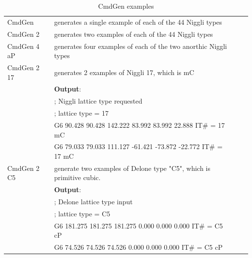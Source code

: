 \documentclass[preprint]{iucr}              %
\numberwithin{equation}{section}
\begin{document}
\begin{table}
		
		\label{CMDGENexamples}
		\caption{CmdGen examples}

		
		\begin{tabular}{l l l l}
			\midrule
			CmdGen & generates a single example of each of the 44 Niggli types\\[2pt]
			CmdGen 2 & generates two examples of each of the 44 Niggli types\\[2pt]
			CmdGen 4 aP & generates four examples of each of the two anorthic Niggli types\\[2pt]
			CmdGen 2 17& generates 2 examples of Niggli 17, which is mC\\
			{}&\textbf{Output}:\\
			{}&; Niggli lattice type requested\\
			{}&; lattice type = 17\\
			{}&G6    90.428    90.428   142.222    83.992    83.992    22.888   IT\# = 17  mC\\
			{}&G6    79.033    79.033   111.127   -61.421   -73.872   -22.772   IT\# = 17  mC\\
			CmdGen 2 C5& generate two examples of Delone type "C5", which is
			primitive cubic.\\
			{}&\textbf{Output}:\\
			{}&; Delone lattice type input\\
			{}&; lattice type = C5\\
			{}&G6   181.275   181.275   181.275     0.000     0.000     0.000   IT\# = C5  cP\\
			{}&G6    74.526    74.526    74.526     0.000     0.000     0.000   IT\# = C5  cP\\[2pt]
			

\end{tabular}
\end{table}
\end{document}
